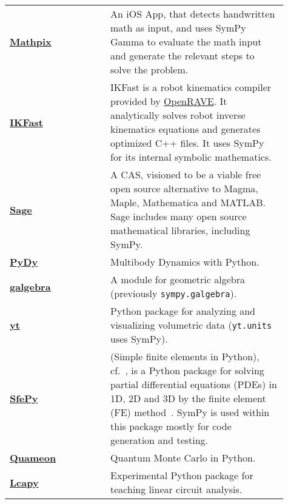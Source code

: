 \begin{longtable}[htbc]{>{\raggedright}p{0.14\linewidth}p{0.14\linewidth}p{0.63\linewidth}}
\href{http://mathpix.com/}{\textbf{Mathpix}}~\cite{Mathpix} &  & An iOS App, that detects handwritten math as input, and uses
  SymPy Gamma to evaluate the math input and generate the relevant
  steps to solve the problem. \\

\href{http://openrave.org/docs/latest_stable/openravepy/ikfast/}{\textbf{IKFast}}~\cite{diankov2010ikfast} &  &
  IKFast is a robot kinematics compiler provided by
  \href{http://openrave.org/}{OpenRAVE}. It analytically solves robot inverse
  kinematics equations and generates optimized C++ files. It uses SymPy for
  its internal symbolic mathematics. \\

\href{http://www.sagemath.org/}{\textbf{Sage}}~\cite{sagemath} &  & A CAS, visioned to be
  a viable free open source alternative to Magma, Maple, Mathematica and
  MATLAB\@. Sage includes many open source mathematical libraries, including
  SymPy. \\

\href{http://www.pydy.org/}{\textbf{PyDy}}~\cite{gede2013constrained} &  & Multibody Dynamics with
  Python. \\

\href{https://github.com/brombo/galgebra}{\textbf{galgebra}}~\cite{galgebra} &  &
  A module for geometric algebra (previously \texttt{sympy.galgebra}). \\

\href{http://yt-project.org/}{\textbf{yt}}~\cite{2011ApJS..192....9T} &  & Python package for
  analyzing and visualizing volumetric data (\texttt{yt.units} uses SymPy). \\

\href{http://sfepy.org/}{\textbf{SfePy}}~\cite{cimrman2014sfepy} &  & (Simple finite elements in Python),
  cf.~\cite{cimrman2014sfepy}, is a Python package for solving partial
  differential equations (PDEs) in 1D, 2D and 3D by the finite element (FE)
  method~\cite{Zienkiewicz2013FEM}. SymPy is used within this package mostly for
  code generation and testing. \\

\href{http://quameon.sourceforge.net/}{\textbf{Quameon}}~\cite{quameon} &  & Quantum
  Monte Carlo in Python. \\

\href{http://lcapy.elec.canterbury.ac.nz/}{\textbf{Lcapy}}~\cite{lcapy} &  &
  Experimental Python package for teaching linear circuit analysis. \\
\bottomrule
\end{longtable}
